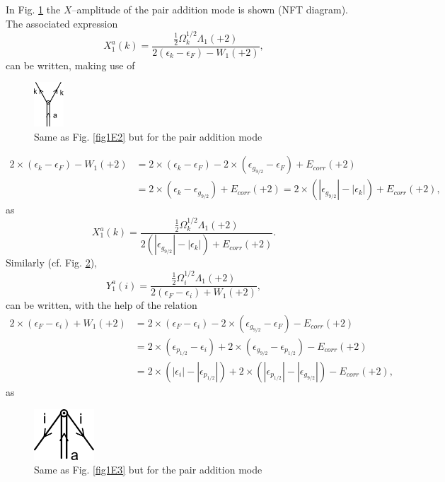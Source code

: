 In Fig. \ref{fig1E4} the $X$--amplitude of the pair addition mode is shown (NFT diagram). The associated expression
\begin{equation*}
X_1^a(k)=\frac{\frac{1}{2}\Omega_k^{1/2}\Lambda_1(+2)}{2(\epsilon_k-\epsilon_F)-W_1(+2)},
\end{equation*}
can be written, making use of
  \begin{figure}
  \centerline{\includegraphics*[width=0.1\textwidth,angle=0]{nutshell/figs/addition_forward.pdf}}
  \caption{Same as Fig. \ref{fig1E2} but for the pair addition mode}\label{fig1E4}
  \end{figure}
  
\begin{equation*}
\begin{split}
2\times(\epsilon_k-\epsilon_F)-W_1(+2)&=2\times(\epsilon_k-\epsilon_F)-2\times(\epsilon_{g_{9/2}}-\epsilon_F)+E_{corr}(+2)\\
&=2\times(\epsilon_k-\epsilon_{g_{9/2}})+E_{corr}(+2)=2\times(|\epsilon_{g_{9/2}}|-|\epsilon_k|)+E_{corr}(+2),
\end{split}
\end{equation*}
as
\begin{equation*}
X_1^a(k)=\frac{\frac{1}{2}\Omega_k^{1/2}\Lambda_1(+2)}{2(|\epsilon_{g_{9/2}}|-|\epsilon_k|)+E_{corr}(+2)}.
\end{equation*}
Similarly (cf. Fig. \ref{fig1E5}),
\begin{equation*}
Y_1^a(i)=\frac{\frac{1}{2}\Omega_i^{1/2}\Lambda_1(+2)}{2(\epsilon_F-\epsilon_i)+W_1(+2)},
\end{equation*}
can be written, with the help of the relation
\begin{equation*}
\begin{split}
2\times(\epsilon_F-\epsilon_i)+W_1(+2)&=2\times(\epsilon_F-\epsilon_i)-2\times(\epsilon_{g_{9/2}}-\epsilon_F)-E_{corr}(+2)\\
&=2\times(\epsilon_{p_{1/2}}-\epsilon_i)+2\times(\epsilon_{g_{9/2}}-\epsilon_{p_{1/2}})-E_{corr}(+2)\\
&=2\times(|\epsilon_i|-|\epsilon_{p_{1/2}}|)+2\times(|\epsilon_{p_{1/2}}|-|\epsilon_{g_{9/2}}|)-E_{corr}(+2),
\end{split}
\end{equation*}
as
  \begin{figure}
  \centerline{\includegraphics*[width=0.2\textwidth,angle=0]{nutshell/figs/addition_backward.pdf}}
  \caption{Same as Fig. \ref{fig1E3} but for the pair addition mode}\label{fig1E5}
  \end{figure}

